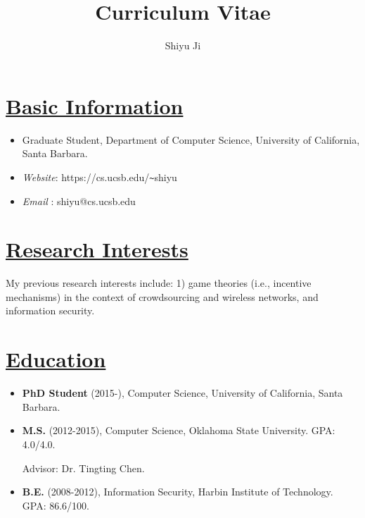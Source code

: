 \documentclass{article}
\newlength{\nL}
\newcommand{\underLineText}[1]{\settowidth{\nL}{#1}\setlength{\nL}{0.8\textwidth-\nL}\underline{{\sc #1}\hspace{\nL}}}
\begin{document}
\title{\bf Curriculum Vitae}
\author{Shiyu Ji}
\date{}
\maketitle

\section*{\underLineText{Basic Information}}
\begin{itemize}
\item Graduate Student, Department of Computer Science, University of California, Santa Barbara.
\item {\it Website}: https://cs.ucsb.edu/\verb+~+shiyu
\item {\it Email} \Letter: shiyu@cs.ucsb.edu
\end{itemize}

\section*{\underLineText{Research Interests}}
My previous research interests include: 1) game theories (i.e., incentive mechanisms) in the context of crowdsourcing and wireless networks, and information security.

\section*{\underLineText{Education}}
\begin{itemize}
\item {\bf PhD Student} (2015-), Computer Science, University of California, Santa Barbara.

\item {\bf M.S.} (2012-2015), Computer Science, Oklahoma State University. GPA: 4.0/4.0.

Advisor: Dr. Tingting Chen.

\item {\bf B.E.} (2008-2012), Information Security, Harbin Institute of Technology. GPA: 86.6/100.
\end{itemize}
\end{document}
